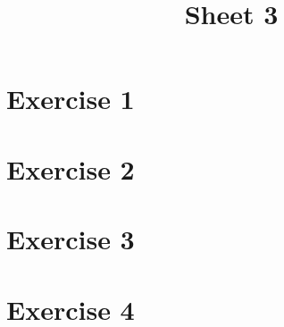 \documentclass[bibliography=totocnumbered]{scrartcl}
\title{Sheet 3}
\begin{document}
    \maketitle
    \tableofcontents
    \listoffigures
    
    \newpage
    \section{Exercise 1}

    \newpage
    \section{Exercise 2}

    \newpage
    \section{Exercise 3}

    \newpage
    \section{Exercise 4}

    \newpage
    \appendix
    \printbibliography[title={Sources}]
\end{document}
